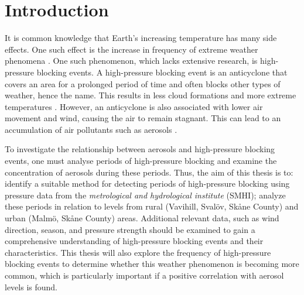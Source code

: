 \section{Introduction}
It is common knowledge that Earth's increasing temperature has many side effects. One such effect is the increase in frequency of extreme weather phenomena \cite{mitchellExtremeEventsDue2006}. One such phenomenon, which lacks extensive research, is high-pressure blocking events. A high-pressure blocking event is an anticyclone that covers an area for a prolonged period of time and often blocks other types of weather, hence the name. This results in less cloud formations and more extreme temperatures \cite{lupoAtmosphericBlockingEvents2020}. However, an anticyclone is also associated with lower air movement and wind, causing the air to remain stagnant. This can lead to an accumulation of air pollutants such as aerosols \cite{caiImpactBlockingStructure2020}.

To investigate the relationship between aerosols and high-pressure blocking events, one must analyse periods of high-pressure blocking and examine the concentration of aerosols during these periods. Thus, the aim of this thesis is to: identify a suitable method for detecting periods of high-pressure blocking using pressure data from the \textit{metrological and hydrological institute} (SMHI); analyze these periods in relation to \PM levels from rural (Vavihill, Svalöv, Skåne County) and urban (Malmö, Skåne County) areas. Additional relevant data, such as wind direction, season, and pressure strength should be examined to gain a comprehensive understanding of high-pressure blocking events and their characteristics. This thesis will also explore the frequency of high-pressure blocking events to determine whether this weather phenomenon is becoming more common, which is particularly important if a positive correlation with aerosol levels is found. 
